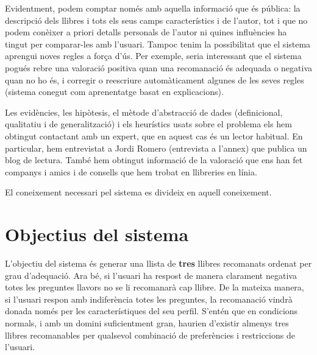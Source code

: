 Evidentment, podem comptar només amb aquella informació que és pública: la descripció dels llibres i tots els seus camps característics i de l'autor, tot i que no podem conèixer a priori detalls personals de l'autor ni quines influències ha tingut per comparar-les amb l'usuari. Tampoc tenim la possibilitat que el sistema aprengui noves regles a força d'ús. Per exemple, seria interessant que el sistema pogués rebre una valoració positiva quan una recomanació és adequada o negativa quan no ho és, i corregir o reescriure automàticament algunes de les seves regles (sistema conegut com aprenentatge basat en explicacions).

Les evidències, les hipòtesis, el mètode d'abstracció de dades (definicional, qualitatiu i de generalització) i els heurístics usats sobre el problema els hem obtingut contactant amb un expert, que en aquest cas és un lector habitual. En particular, hem entrevistat a Jordi Romero (entrevista a l'annex) que publica un blog de lectura. També hem obtingut informació de la valoració que ens han fet companys i amics i de consells que hem trobat en llibreries en línia.

El coneixement necessari pel sistema es divideix en aquell coneixement.


\section{Objectius del sistema}

L'objectiu del sistema és generar una llista de \textbf{tres} llibres recomanats ordenat per grau d'adequació. Ara bé, si l'usuari ha respost de manera clarament negativa totes les preguntes llavors no se li recomanarà cap llibre. De la mateixa manera, si l'usuari respon amb indiferència totes les preguntes, la recomanació vindrà donada només per les característiques del seu perfil. S'entén que en condicions normals, i amb un domini suficientment gran, haurien d'existir almenys tres llibres recomanables per qualsevol combinació de preferències i restriccions de l'usuari.





